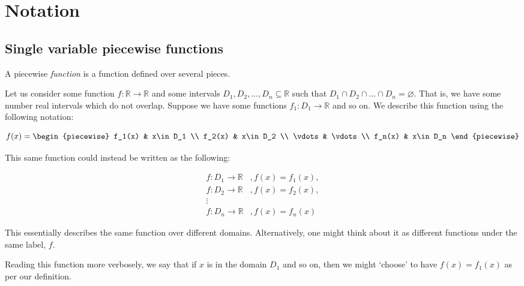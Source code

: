 \label{section:notation}
\section{Notation}
\subsection{Single variable piecewise functions}
A piecewise \textit{function} is a function defined over several pieces. 

Let us consider some function $f:\mathbb{R}\to\mathbb{R}$ and some intervals ${D_1,D_2,\dots,D_n\subseteq\mathbb{R}}$ such that ${D_1\cap D_2\cap \dots\cap D_n=\varnothing}$. That is, we have some number real intervals which do not overlap. Suppose we have some functions $f_1: D_1\to\mathbb{R}$ and so on. We describe this function using the following notation:

$$
    f(x) = \begin{piecewise} 
                f_1(x) & x\in D_1 \\
                f_2(x) & x\in D_2 \\
                \vdots & \vdots \\
                f_n(x) & x\in D_n
            \end{piecewise}
$$

This same function could instead be written as the following:

\begin{align*}
    f:D_1\to\mathbb{R}&, f(x)=f_1(x), \\
    f:D_2\to\mathbb{R}&, f(x)=f_2(x), \\
    \vdots \\
    f:D_n\to\mathbb{R}&, f(x)=f_n(x)
\end{align*}

This essentially describes the same function over different domains. Alternatively, one might think about it as different functions under the same label, $f$.

Reading this function more verbosely, we say that if $x$ is in the domain $D_1$ and so on, then we might `choose' to have $f(x)=f_1(x)$ as per our definition.

